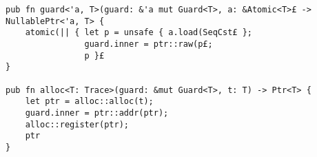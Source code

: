 \begin{lstlisting}[caption=Commonly used operations defined by CMR.]
pub fn guard<'a, T>(guard: &'a mut Guard<T>, a: &Atomic<T>£ -> NullablePtr<'a, T> {
    atomic(|| { let p = unsafe { a.load(SeqCst£ };
                guard.inner = ptr::raw(p£;
                p }£
}

pub fn alloc<T: Trace>(guard: &mut Guard<T>, t: T) -> Ptr<T> {
    let ptr = alloc::alloc(t);
    guard.inner = ptr::addr(ptr);
    alloc::register(ptr);
    ptr
}\end{lstlisting}
